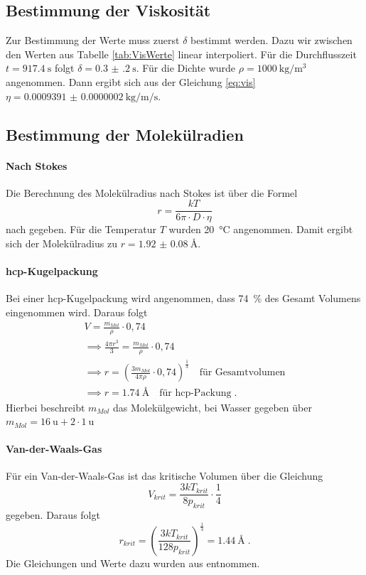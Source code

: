 \subsection{Bestimmung der Viskosität}
Zur Bestimmung der Werte muss zuerst $\delta$ bestimmt werden. Dazu wir zwischen den Werten aus Tabelle \ref{tab:VisWerte}
linear interpoliert. Für die Durchflusszeit $t = \SI{917 .4}{\second}$ folgt $\delta = \SI{0.3(2)}{\second}$. Für die
Dichte wurde $\rho = \SI{1000}{\kilo\gram\per \cubic\meter}$ angenommen. Dann ergibt sich
aus der Gleichung \eqref{eq:vis} $\eta = \SI{0.0009391(2)}{\kilo\gram\per\meter\per\second}$.
\subsection{Bestimmung der Molekülradien}
\paragraph{Nach Stokes}
Die Berechnung des Molekülradius nach Stokes ist über die Formel
\begin{equation}
r = \frac{kT}{6\pi \cdot D \cdot \eta}
\end{equation}
nach \cite{Anleitung} gegeben. Für die Temperatur $T$ wurden \SI{20}{\celsius} angenommen. Damit ergibt sich der
Molekülradius zu $r = \SI{1.92(8)}{\angstrom}$.
\paragraph{hcp-Kugelpackung}
Bei einer hcp-Kugelpackung wird angenommen, dass \SI{74}{\percent} des Gesamt Volumens eingenommen wird. Daraus folgt
\begin{gather}
V = \frac{m_{Mol}}{\rho} \cdot 0,74 \\
\implies \frac{4\pi r^3}{3} =\frac{m_{Mol}}{\rho}\cdot 0,74 \\
\implies r = \left( \frac{3m_{Mol}}{4\pi \rho }\cdot 0,74 \right)^{\frac{1}{3}} 
\quad \text{für Gesamtvolumen} \\
\implies r = \SI{1.74}{\angstrom} \quad \text{für hcp-Packung} \; . 
\end{gather}
Hierbei beschreibt $m_{Mol}$ das Molekülgewicht, bei Wasser gegeben über $m_{Mol} = \SI{16}{\atomicmassunit} + 2\cdot \SI{1}{\atomicmassunit}$
\paragraph{Van-der-Waals-Gas}
Für ein Van-der-Waals-Gas ist das kritische Volumen über die Gleichung
\begin{equation}
V_{krit}= \frac{3kT_{krit}}{8p_{krit}} \cdot \frac{1}{4}	
\end{equation}
gegeben. Daraus folgt
\begin{equation}
r_{krit} = \left( \frac{3kT_{krit}}{128p_{krit}} \right)^{\frac{1}{3}} = \SI{1.44}{\angstrom} \;.
\end{equation}
Die Gleichungen und Werte dazu wurden aus \cite{spektrum} entnommen.
